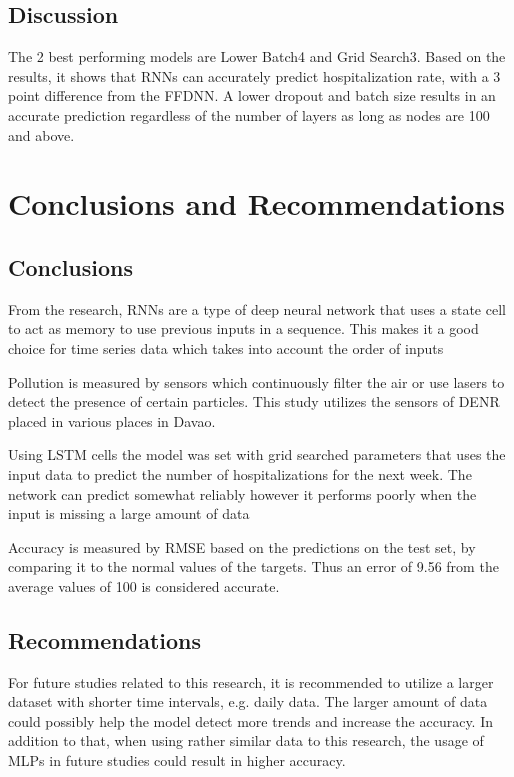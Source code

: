 \documentclass[10pt,11pt,12pt,oneside]{book}
\begin{document}
\section{Discussion}

    The 2 best performing models are Lower Batch4 and Grid Search3. Based on the results, it shows that RNNs can accurately predict hospitalization rate, with a 3 point difference from the FFDNN. A lower dropout and batch size results in an accurate prediction regardless of the number of layers as long as nodes are 100 and above.
\chapter{Conclusions and Recommendations}
\section{Conclusions}
From the research, RNNs are a type of deep neural network that uses a state cell to act as memory to use previous inputs in a sequence. This makes it a good choice for time series data which takes into account the order of inputs


Pollution is measured by sensors which continuously filter the air or use lasers to detect the presence of certain particles. This study utilizes the sensors of DENR placed in various places in Davao.


Using LSTM cells the model was set with grid searched parameters that uses the input data to predict the number of hospitalizations for the next week. The network can predict somewhat reliably however it performs poorly when the input is missing a large amount of data


Accuracy is measured by RMSE based on the predictions on the test set, by comparing it to the normal values of the targets. Thus an error of 9.56 from the average values of 100 is considered accurate.


\section{Recommendations}
For future studies related to this research, it is recommended to utilize a larger dataset with shorter time intervals, e.g. daily data. The larger amount of data could possibly help the model detect more trends and increase the accuracy. In addition to that, when using rather similar data to this research, the usage of MLPs in future studies could result in higher accuracy.

    
    
\end{document}
